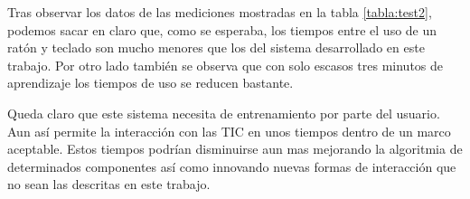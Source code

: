 Tras observar los datos de las mediciones mostradas en la tabla \ref{tabla:test2}, podemos sacar en claro que, como se esperaba, los tiempos entre el uso de un rat\'on y teclado son mucho menores que los del sistema desarrollado en este trabajo. Por otro lado tambi\'en se observa que con solo escasos tres minutos de aprendizaje los tiempos de uso se reducen bastante.

Queda claro que este sistema necesita de entrenamiento por parte del usuario. Aun as\'i permite la interacci\'on con las TIC en unos tiempos dentro de un marco aceptable. Estos tiempos podr\'ian disminuirse aun mas mejorando la algoritmia de determinados componentes as\'i como innovando nuevas formas de interacci\'on que no sean las descritas en este trabajo.
